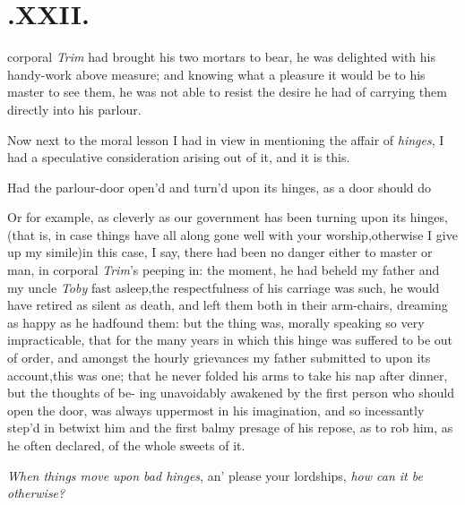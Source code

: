 \documentclass{article}
\begin{document}
\null
\section{.\quad  XXII.}

 corporal \textit{Trim} had brought
his two mortars to bear, he was delighted with his handy-work
above\break
measure; and knowing what a pleasure it would be to his master to
see them, he was not able to resist the desire he had of carrying
them directly into his parlour.

Now next to the moral lesson I had in view in mentioning the
affair of \textit{hinges}, I had a speculative consideration arising
out of it, and it is this.

Had the parlour-door open’d and\break
turn’d upon its hinges, as a door should do\tsh{}

\tsk Or for example, as cleverly as our government has been
turning upon its hinges,\tsh (that is, in case things have all
along gone well with your worship,\tsk otherwise I give up my
simile)\tsk in this case, I say, there had been no danger either
to master or man, in corporal \textit{Trim}’s peeping in: the
moment, he had beheld my father and my uncle \textit{Toby} fast
asleep,\break\tsk the respectfulness of his carriage was such,
he would have retired as silent as death, and left them both in
their arm-chairs, dreaming as happy as he had\break found them:
but the thing was, morally speaking so very impracticable, that
for the many years in which this hinge was suffered to be out of
order, and amongst the hourly grievances my father submitted to
upon its account,\tsk this was one; that he never folded his
arms to take his nap after dinner, but the thoughts of be-
ing unavoidably awakened by the first person who should open the
door, was always uppermost in his imagination, and so
incessantly step’d in betwixt him and the first balmy presage
of his repose, as to rob him, as he often declared, of the whole
sweets of it.

\indent
\lqq\textit{When things move upon bad hinges}, an’ please your lordships, \textit{how can
it be otherwise?}
\end{document}
